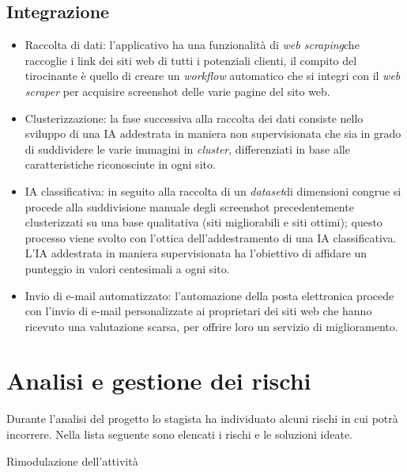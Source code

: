 \subsection{Integrazione}
\begin{itemize}
    \item Raccolta di dati: l'applicativo ha una funzionalità di \emph{web scraping}\glsfirstoccur che raccoglie i link dei siti web di tutti i potenziali clienti, il compito del tirocinante è quello di creare un \emph{workflow} automatico che si integri con il \emph{web scraper} per acquisire screenshot delle varie pagine del sito web. 
    \item Clusterizzazione: la fase successiva alla raccolta dei dati consiste nello sviluppo di una IA addestrata in maniera non supervisionata che sia in grado di suddividere le varie immagini in \emph{cluster}, differenziati in base alle caratteristiche riconosciute in ogni sito. 
    \item IA classificativa: in seguito alla raccolta di un \emph{dataset}\glsfirstoccur di dimensioni congrue si procede alla suddivisione manuale degli screenshot precedentemente clusterizzati su una base qualitativa (siti migliorabili e siti ottimi); questo processo viene svolto con l'ottica dell'addestramento di una IA classificativa.
    L'IA addestrata in maniera supervisionata ha l'obiettivo di affidare un punteggio in valori centesimali a ogni sito. 
    \item Invio di e-mail automatizzato: l'automazione della posta elettronica procede con l'invio di e-mail personalizzate ai proprietari dei siti web che hanno ricevuto una valutazione scarsa, per offrire loro un servizio di miglioramento.
\end{itemize}

\section{Analisi e gestione dei rischi}
Durante l'analisi del progetto lo stagista ha individuato alcuni rischi in cui potrà incorrere.
Nella lista seguente sono elencati i rischi e le soluzioni ideate.\\

\begin{risk}{Rimodulazione dell'attività}
    \label{risk: tempistiche ristrette} 
\end{risk}

